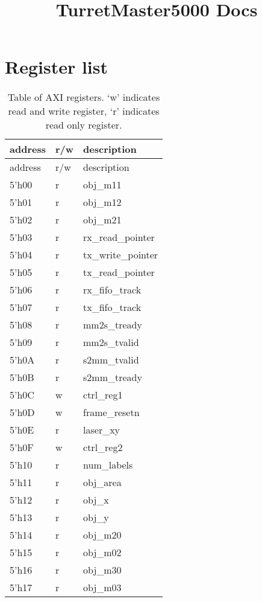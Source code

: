 \documentclass[]{article}
\title{TurretMaster5000 Docs}
\date{}
\begin{document}
\maketitle

\section{Register list}\label{register-list}

\begin{longtable}[c]{@{}lll@{}}
\caption{Table of AXI registers. `w' indicates read and write register,
`r' indicates read only register.}\tabularnewline
\toprule
address & r/w & description\tabularnewline
\midrule
\endfirsthead
\toprule
address & r/w & description\tabularnewline
\midrule
\endhead
5'h00 & r & obj\_m11\tabularnewline
5'h01 & r & obj\_m12\tabularnewline
5'h02 & r & obj\_m21\tabularnewline
5'h03 & r & rx\_read\_pointer\tabularnewline
5'h04 & r & tx\_write\_pointer\tabularnewline
5'h05 & r & tx\_read\_pointer\tabularnewline
5'h06 & r & rx\_fifo\_track\tabularnewline
5'h07 & r & tx\_fifo\_track\tabularnewline
5'h08 & r & mm2s\_tready\tabularnewline
5'h09 & r & mm2s\_tvalid\tabularnewline
5'h0A & r & s2mm\_tvalid\tabularnewline
5'h0B & r & s2mm\_tready\tabularnewline
5'h0C & w & ctrl\_reg1\tabularnewline
5'h0D & w & frame\_resetn\tabularnewline
5'h0E & r & laser\_xy\tabularnewline
5'h0F & w & ctrl\_reg2\tabularnewline
5'h10 & r & num\_labels\tabularnewline
5'h11 & r & obj\_area\tabularnewline
5'h12 & r & obj\_x\tabularnewline
5'h13 & r & obj\_y\tabularnewline
5'h14 & r & obj\_m20\tabularnewline
5'h15 & r & obj\_m02\tabularnewline
5'h16 & r & obj\_m30\tabularnewline
5'h17 & r & obj\_m03\tabularnewline
\bottomrule
\end{longtable}
\end{document}
